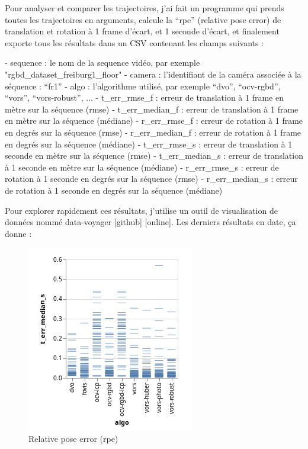 Pour analyser et comparer les trajectoires, j’ai fait un programme qui prends toutes les trajectoires en arguments, calcule la “rpe” (relative pose error) de translation et rotation à 1 frame d’écart, et 1 seconde d’écart, et finalement exporte tous les résultats dans un CSV contenant les champs suivants :

- sequence : le nom de la sequence vidéo, par exemple "rgbd\_dataset\_freiburg1\_floor"
- camera : l’identifiant de la caméra associée à la séquence : “fr1”
- algo : l’algorithme utilisé, par exemple “dvo”, “ocv-rgbd”, “vors”, “vors-robust”, ...
- t\_err\_rmse\_f : erreur de translation à 1 frame en mètre sur la séquence (rmse)
- t\_err\_median\_f : erreur de translation à 1 frame en mètre sur la séquence (médiane)
- r\_err\_rmse\_f : erreur de rotation à 1 frame en degrés sur la séquence (rmse)
- r\_err\_median\_f : erreur de rotation à 1 frame en degrés sur la séquence (médiane)
- t\_err\_rmse\_s : erreur de translation à 1 seconde en mètre sur la séquence (rmse)
- t\_err\_median\_s : erreur de translation à 1 seconde en mètre sur la séquence (médiane)
- r\_err\_rmse\_s : erreur de rotation à 1 seconde en degrés sur la séquence (rmse)
- r\_err\_median\_s : erreur de rotation à 1 seconde en degrés sur la séquence (médiane)

Pour explorer rapidement ces résultats, j’utilise un outil de visualisation de données nommé data-voyager [github] [online]. Les derniers résultats en date, ça donne :

\begin{figure}[ht]
	\centering
	\includegraphics[width=\linewidth]{assets/img/rpe-2019-04-04.png}
	\caption{Relative pose error (rpe)}%
	\label{fig:rpe-eval}
\end{figure}

